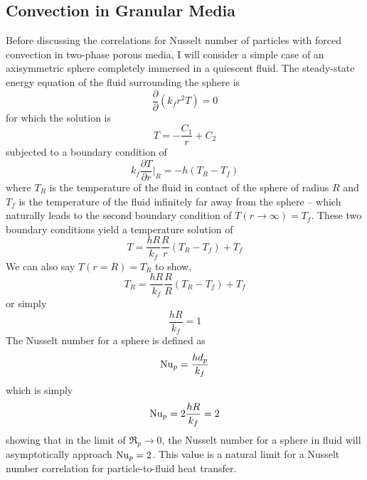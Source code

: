 \subsection{Convection in Granular Media}\label{sec:particle-convection}
Before discussing the correlations for Nusselt number of particles with forced convection in two-phase porous media, I will consider a simple case of an axisymmetric sphere completely immersed in a quiescent fluid. The steady-state energy equation of the fluid surrounding the sphere is 
\begin{equation}
    \frac{\partial}{\partial}(k_fr^2T) = 0
\end{equation}
for which the solution is 
\begin{equation}
    T = -\frac{C_1}{r} + C_2
\end{equation}
subjected to a boundary condition of
\begin{equation}
    k_f\frac{\partial T}{\partial r}\Bigg|_R = -h(T_R - T_f)
\end{equation}
where $T_R$ is the temperature of the fluid in contact of the sphere of radius $R$ and $T_f$ is the temperature of the fluid infinitely far away from the sphere -- which naturally leads to the second boundary condition of $T(r\rightarrow\infty) = T_f$. These two boundary conditions yield a temperature solution of 
\begin{equation}
    T = \frac{hR}{k_f}\frac{R}{r}(T_R -T_f) + T_f
\end{equation}
We can also say $T(r = R) = T_R$ to show,
\begin{equation}
    T_R = \frac{hR}{k_f}\frac{R}{R}(T_R -T_f) + T_f
\end{equation}
or simply
\begin{equation}
    \frac{hR}{k_f} = 1
\end{equation}
The Nusselt number for a sphere is defined as
\begin{equation}
    \mathrm{Nu}_p = \frac{hd_p}{k_f}
\end{equation}
which is simply
\begin{equation}
    \mathrm{Nu}_p = 2\frac{hR}{k_f} = 2
\end{equation}
showing that in the limit of $\Re_p \rightarrow 0$, the Nusselt number for a sphere in fluid will asymptotically approach $\mathrm{Nu}_p = 2$. This value is a natural limit for a Nusselt number correlation for particle-to-fluid heat transfer. 

